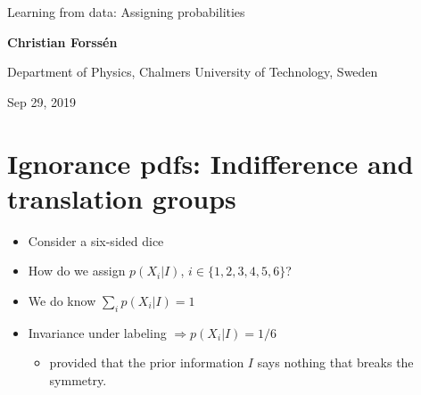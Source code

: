 \documentclass[%
oneside,                 %
final,                   %
10pt]{article}
\begin{document}

\newcommand{\exercisesection}[1]{\subsection*{#1}}







\thispagestyle{empty}

\begin{center}
{\LARGE\bf
\begin{spacing}{1.25}
Learning from data: Assigning probabilities
\end{spacing}
}
\end{center}


\begin{center}
{\bf Christian Forssén}
\end{center}

    \begin{center}
\centerline{{\small Department of Physics, Chalmers University of Technology, Sweden}}
\end{center}
    

\begin{center}
Sep 29, 2019
\end{center}

\vspace{1cm}


\section{Ignorance pdfs: Indifference and translation groups}

\begin{itemize}
\item Consider a six-sided dice

\item How do we assign $p(X_i|I)$, $i \in \{1, 2, 3, 4, 5, 6\}$?

\item We do know $\sum_i p(X_i|I) = 1$

\item Invariance under labeling $\Rightarrow p(X_i|I)=1/6$
\begin{itemize}

  \item provided that the prior information $I$ says nothing that breaks the symmetry.
\end{itemize}

\noindent
\end{itemize}
\end{document}
